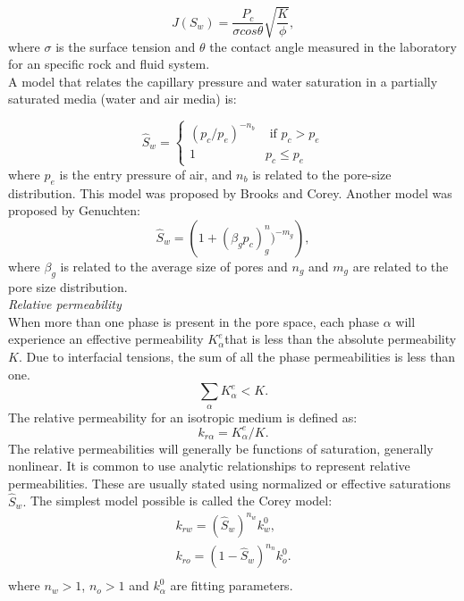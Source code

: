 \documentclass[a4paper,10pt]{report}
\begin{document}
\begin{equation}
 J(S_w)=\frac{P_c}{\sigma cos \theta}\sqrt{\frac{K}{\phi}},
\end{equation}
where $\sigma$ is the surface tension and $\theta$ the contact angle measured in the laboratory for an specific rock and fluid system.\\
A model that relates the capillary pressure and water saturation in a partially saturated media (water and air media) is:

\begin{equation*}
\hat{S}_w=
\begin{cases}
(p_c/p_e)^{-n_b} & \text{ if } p_c>p_e\\
1& p_c \leq p_e
\end{cases}
\end{equation*}
where $p_e$ is the entry pressure of air, and $n_b$ is related to the pore-size distribution. This model was proposed by Brooks and Corey.
Another model was proposed by Genuchten:
\begin{equation}
 \hat{S}_w=\left( 1+(\beta_gp_c)^n_g)^{-m_g}\right),
\end{equation}
where $\beta_g$ is related to the average size of pores and $n_g$ and $m_g$ are related to the pore size distribution. \\
\emph{Relative permeability}\\
When more than one phase is present in the pore space, each phase $\alpha$ will experience an effective permeability $K_{\alpha}^ e$that is less than the absolute permeability $K$. Due to interfacial tensions, the sum of all the phase permeabilities is less than one.
$$\sum_{\alpha}K_{\alpha}^e<K.$$
The relative permeability for an isotropic medium is defined as:
$$k_{r\alpha}=K_{\alpha}^e/K.$$
The relative permeabilities will generally be functions of saturation, generally nonlinear.
It is common to use analytic relationships to represent relative permeabilities. These are usually stated using normalized or effective saturations $\hat{S}_w.$ The simplest model possible is called the Corey model:
\begin{equation}\label{eq:Corey}
\begin{aligned}
k_{rw}=(\hat{S}_w)^{n_w}k_w^0,\\
k_{ro}=(1-\hat{S}_w)^{n_n}k_o^0.\\
\end{aligned}
\end{equation}
where $n_w>1$, $n_o>1$ and $k_{\alpha}^0$ are fitting parameters.\\
\end{document}
